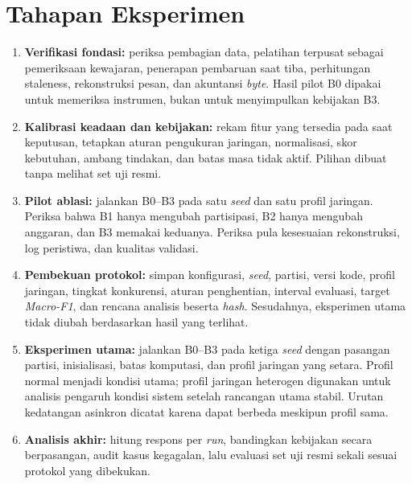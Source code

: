 \section{Tahapan Eksperimen}
\begin{enumerate}
  \item \textbf{Verifikasi fondasi:} periksa pembagian data, pelatihan terpusat sebagai pemeriksaan kewajaran, penerapan pembaruan saat tiba, perhitungan staleness, rekonstruksi pesan, dan akuntansi \textit{byte}. Hasil pilot B0 dipakai untuk memeriksa instrumen, bukan untuk menyimpulkan kebijakan B3.
  \item \textbf{Kalibrasi keadaan dan kebijakan:} rekam fitur yang tersedia pada saat keputusan, tetapkan aturan pengukuran jaringan, normalisasi, skor kebutuhan, ambang tindakan, dan batas masa tidak aktif. Pilihan dibuat tanpa melihat set uji resmi.
  \item \textbf{Pilot ablasi:} jalankan B0--B3 pada satu \textit{seed} dan satu profil jaringan. Periksa bahwa B1 hanya mengubah partisipasi, B2 hanya mengubah anggaran, dan B3 memakai keduanya. Periksa pula kesesuaian rekonstruksi, log peristiwa, dan kualitas validasi.
  \item \textbf{Pembekuan protokol:} simpan konfigurasi, \textit{seed}, partisi, versi kode, profil jaringan, tingkat konkurensi, aturan penghentian, interval evaluasi, target \textit{Macro-F1}, dan rencana analisis beserta \textit{hash}. Sesudahnya, eksperimen utama tidak diubah berdasarkan hasil yang terlihat.
  \item \textbf{Eksperimen utama:} jalankan B0--B3 pada ketiga \textit{seed} dengan pasangan partisi, inisialisasi, batas komputasi, dan profil jaringan yang setara. Profil normal menjadi kondisi utama; profil jaringan heterogen digunakan untuk analisis pengaruh kondisi sistem setelah rancangan utama stabil. Urutan kedatangan asinkron dicatat karena dapat berbeda meskipun profil sama.
  \item \textbf{Analisis akhir:} hitung respons per \textit{run}, bandingkan kebijakan secara berpasangan, audit kasus kegagalan, lalu evaluasi set uji resmi sekali sesuai protokol yang dibekukan.
\end{enumerate}


